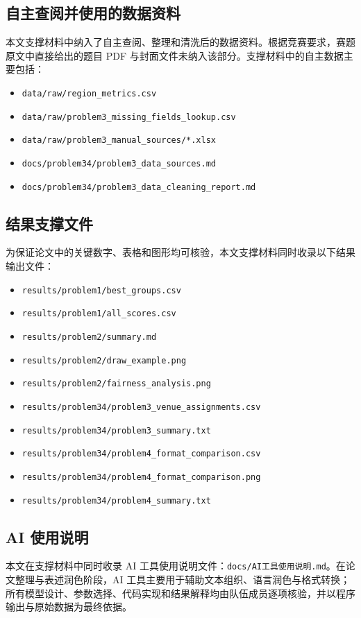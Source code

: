 \documentclass[UTF8,a4paper,12pt]{ctexart}
\begin{document}
\subsection{自主查阅并使用的数据资料}

本文支撑材料中纳入了自主查阅、整理和清洗后的数据资料。根据竞赛要求，赛题原文中直接给出的题目 PDF 与封面文件未纳入该部分。支撑材料中的自主数据主要包括：
\begin{itemize}
  \item \texttt{data/raw/region\_metrics.csv}
  \item \texttt{data/raw/problem3\_missing\_fields\_lookup.csv}
  \item \texttt{data/raw/problem3\_manual\_sources/*.xlsx}
  \item \texttt{docs/problem34/problem3\_data\_sources.md}
  \item \texttt{docs/problem34/problem3\_data\_cleaning\_report.md}
\end{itemize}

\subsection{结果支撑文件}

为保证论文中的关键数字、表格和图形均可核验，本文支撑材料同时收录以下结果输出文件：
\begin{itemize}
  \item \texttt{results/problem1/best\_groups.csv}
  \item \texttt{results/problem1/all\_scores.csv}
  \item \texttt{results/problem2/summary.md}
  \item \texttt{results/problem2/draw\_example.png}
  \item \texttt{results/problem2/fairness\_analysis.png}
  \item \texttt{results/problem34/problem3\_venue\_assignments.csv}
  \item \texttt{results/problem34/problem3\_summary.txt}
  \item \texttt{results/problem34/problem4\_format\_comparison.csv}
  \item \texttt{results/problem34/problem4\_format\_comparison.png}
  \item \texttt{results/problem34/problem4\_summary.txt}
\end{itemize}

\subsection{AI 使用说明}

本文在支撑材料中同时收录 AI 工具使用说明文件：\texttt{docs/AI工具使用说明.md}。在论文整理与表述润色阶段，AI 工具主要用于辅助文本组织、语言润色与格式转换；所有模型设计、参数选择、代码实现和结果解释均由队伍成员逐项核验，并以程序输出与原始数据为最终依据。
\end{document}
